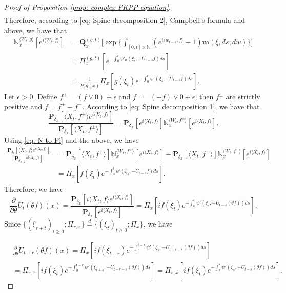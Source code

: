 \begin{proof}[Proof of Proposition \ref{prop: complex FKPP-equation}]
\begin{align}
\end{align}
    Therefore, according to \eqref{eq: Spine decomposition 2}, Campbell's formula and above, we have that
\begin{align}
\label{eq: N to Pi}
    \mathbb N_x^{\langle W_{t}, g\rangle}[e^{i \langle W_t, f\rangle}]
    &=\mathbf Q_x^{(g,t)} \Big[\exp\Big\{\int_{[0,t]\times \mathbb N}(e^{i \langle w_{t-s}, f\rangle} - 1) \mathbf m(\xi, ds,dw)\Big\}\Big]
    \\&= \Pi_x^{(g,t)} [e^{-\int_0^t \psi'_0(\xi_s, -U_{t-s}f)ds}]
    \\&= \frac{1}{P_t^{\beta} g (x)} \Pi_x[ g(\xi_t) e^{-\int_0^t \psi'(\xi_s, -U_{t-s}f)ds} ].
\end{align}
    Let $\epsilon >0$.
    Define $f^+ = (f \vee 0) + \epsilon$ and $f^- = (-f) \vee 0 + \epsilon$, then $f^\pm$ are strictly positive and $f = f^+ - f^-$.
    According to \eqref{eq: Spine decomposition 1}, we have that
\begin{equation}
    \frac{\mathbf P_{\delta_x}[\langle X_t,f^{\pm}\rangle e^{i \langle X_t,f\rangle}]}{\mathbf P_{\delta_x}[\langle X_t,f^{\pm}\rangle ]}
    = \mathbf P_{\delta_x}[e^{i \langle X_t,f\rangle}] \mathbb N_x^{\langle W_t,f^{\pm}\rangle}[e^{i \langle X_t,f\rangle}].
\end{equation}
    Using \eqref{eq: N to Pi} and the above, we have
\begin{align}
    \frac{\mathbf P_{\delta_x}[\langle X_t, f\rangle e^{i \langle X_t, f\rangle}] }{\mathbf P_{\delta_x}[e^{i \langle X_t, f\rangle}]}
    &= \mathbf P_{\delta_x}[\langle X_t, f^+\rangle] \mathbb N_x^{\langle W_t, f^+\rangle} [e^{i \langle X_t, f\rangle}] - \mathbf P_{\delta_x}[\langle X_t, f^-\rangle]\mathbb N_x^{\langle W_t, f^-\rangle}[e^{i \langle X_t, f\rangle}]
    \\& = \Pi_x[ f(\xi_t) e^{- \int_0^t \psi'(\xi_s, -U_{t-s}f) ds}  ].
\end{align}
    Therefore, we have
\begin{equation}
    \frac{\partial}{\partial \theta} {U_t(\theta f)(x)}
    = \frac{\mathbf P_{\delta_x}[i\langle X_t, f\rangle e^{i \langle X_t, f\rangle}] }{\mathbf P_{\delta_x}[e^{i \langle X_t, f\rangle}]}
    =  \Pi_x[ if(\xi_t) e^{ - \int_0^t \psi'(\xi_s, -U_{t-s}(\theta f)) ds} ].
\end{equation}
    Since $\{(\xi_{r+t})_{t \geq 0}; \Pi_{r,x}\} \overset{d}{=} \{(\xi_{t})_{t\geq 0}; \Pi_{x}\} $, we have

\begin{align}
    &\frac{\partial}{\partial \theta} U_{t-r}(\theta f)( x)
    = \Pi_x[ i f(\xi_{t-r}) e^{-\int_0^{t-r} \psi'(\xi_s, -U_{t-r-s}(\theta f)) ds} ]
    \\&= \Pi_{r,x}[i f(\xi_t)e^{-\int_0^{t-r} \psi'(\xi_{r+s}, -U_{t-r-s}(\theta f)) ds} ]
    = \Pi_{r,x}[if(\xi_t)e^{-\int_r^t \psi'(\xi_{s}, -U_{t-s}(\theta f)) ds} ].
\end{align}


\end{proof}

